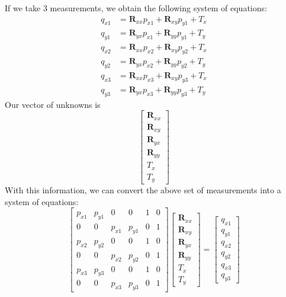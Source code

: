 \documentclass[]{article}
\begin{document}
If we take 3 measurements, we obtain the following system of equations:
\begin{align}
	q_{x1} &= \mathbf{R}_{xx} p_{x1} + \mathbf{R}_{xy} p_{y1} + T_x \\
	q_{y1} &= \mathbf{R}_{yx} p_{x1} + \mathbf{R}_{yy} p_{y1} + T_y \\
	q_{x2} &= \mathbf{R}_{xx} p_{x2} + \mathbf{R}_{xy} p_{y2} + T_x \\
	q_{y2} &= \mathbf{R}_{yx} p_{x2} + \mathbf{R}_{yy} p_{y2} + T_y \\
	q_{x3} &= \mathbf{R}_{xx} p_{x3} + \mathbf{R}_{xy} p_{y3} + T_x \\
	q_{y3} &= \mathbf{R}_{yx} p_{x3} + \mathbf{R}_{yy} p_{y3} + T_y
\end{align}
Our vector of unknowns is 
\begin{equation}
	\begin{bmatrix}
	\mathbf{R}_{xx} \\
	\mathbf{R}_{xy} \\
	\mathbf{R}_{yx} \\
	\mathbf{R}_{yy} \\
	T_x \\
	T_y
	\end{bmatrix}
\end{equation}
With this information, we can convert the above set of measurements into a system of equations: 
\begin{equation}
	\begin{bmatrix}
	p_{x1} & p_{y1} & 0 & 0 & 1 & 0 \\
	0 & 0 & p_{x1} & p_{y1} & 0 & 1 \\
	p_{x2} & p_{y2} & 0 & 0 & 1 & 0 \\
	0 & 0 & p_{x2} & p_{y2} & 0 & 1 \\
	p_{x3} & p_{y3} & 0 & 0 & 1 & 0 \\
	0 & 0 & p_{x3} & p_{y3} & 0 & 1
	\end{bmatrix}
	\begin{bmatrix}
	\mathbf{R}_{xx} \\
	\mathbf{R}_{xy} \\
	\mathbf{R}_{yx} \\
	\mathbf{R}_{yy} \\
	T_x \\
	T_y
	\end{bmatrix}
	=
	\begin{bmatrix}
	q_{x1} \\
	q_{y1} \\
	q_{x2} \\
	q_{y2} \\
	q_{x3} \\
	q_{y3}
	\end{bmatrix}
\end{equation}
\end{document}
